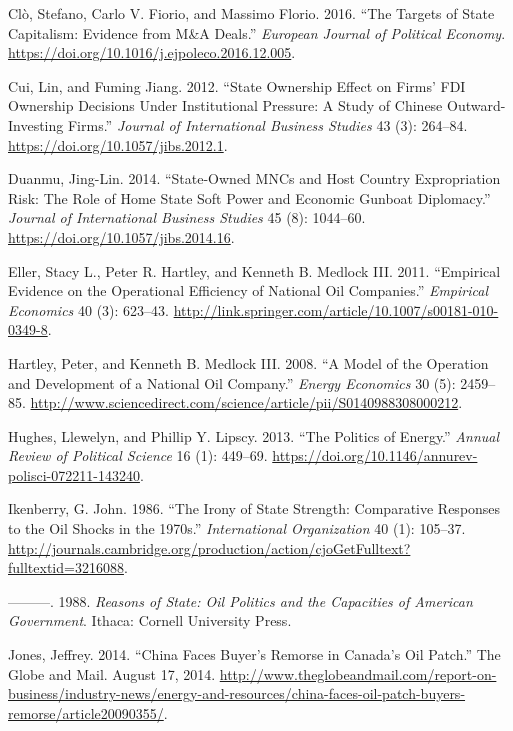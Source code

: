 \documentclass[11pt,]{book}
\begin{document}
\leavevmode\hypertarget{ref-clo_targets_2016}{}%
Clò, Stefano, Carlo V. Fiorio, and Massimo Florio. 2016. ``The Targets of State Capitalism: Evidence from M\&A Deals.'' \emph{European Journal of Political Economy}. \url{https://doi.org/10.1016/j.ejpoleco.2016.12.005}.

\leavevmode\hypertarget{ref-cui_state_2012}{}%
Cui, Lin, and Fuming Jiang. 2012. ``State Ownership Effect on Firms' FDI Ownership Decisions Under Institutional Pressure: A Study of Chinese Outward-Investing Firms.'' \emph{Journal of International Business Studies} 43 (3): 264--84. \url{https://doi.org/10.1057/jibs.2012.1}.

\leavevmode\hypertarget{ref-duanmu_state-owned_2014}{}%
Duanmu, Jing-Lin. 2014. ``State-Owned MNCs and Host Country Expropriation Risk: The Role of Home State Soft Power and Economic Gunboat Diplomacy.'' \emph{Journal of International Business Studies} 45 (8): 1044--60. \url{https://doi.org/10.1057/jibs.2014.16}.

\leavevmode\hypertarget{ref-eller_empirical_2011}{}%
Eller, Stacy L., Peter R. Hartley, and Kenneth B. Medlock III. 2011. ``Empirical Evidence on the Operational Efficiency of National Oil Companies.'' \emph{Empirical Economics} 40 (3): 623--43. \url{http://link.springer.com/article/10.1007/s00181-010-0349-8}.

\leavevmode\hypertarget{ref-hartley_model_2008}{}%
Hartley, Peter, and Kenneth B. Medlock III. 2008. ``A Model of the Operation and Development of a National Oil Company.'' \emph{Energy Economics} 30 (5): 2459--85. \url{http://www.sciencedirect.com/science/article/pii/S0140988308000212}.

\leavevmode\hypertarget{ref-hughes_politics_2013}{}%
Hughes, Llewelyn, and Phillip Y. Lipscy. 2013. ``The Politics of Energy.'' \emph{Annual Review of Political Science} 16 (1): 449--69. \url{https://doi.org/10.1146/annurev-polisci-072211-143240}.

\leavevmode\hypertarget{ref-ikenberry_irony_1986}{}%
Ikenberry, G. John. 1986. ``The Irony of State Strength: Comparative Responses to the Oil Shocks in the 1970s.'' \emph{International Organization} 40 (1): 105--37. \url{http://journals.cambridge.org/production/action/cjoGetFulltext?fulltextid=3216088}.

\leavevmode\hypertarget{ref-ikenberry_reasons_1988}{}%
---------. 1988. \emph{Reasons of State: Oil Politics and the Capacities of American Government}. Ithaca: Cornell University Press.

\leavevmode\hypertarget{ref-jones_china_2014}{}%
Jones, Jeffrey. 2014. ``China Faces Buyer's Remorse in Canada's Oil Patch.'' The Globe and Mail. August 17, 2014. \url{http://www.theglobeandmail.com/report-on-business/industry-news/energy-and-resources/china-faces-oil-patch-buyers-remorse/article20090355/}.
\end{document}

